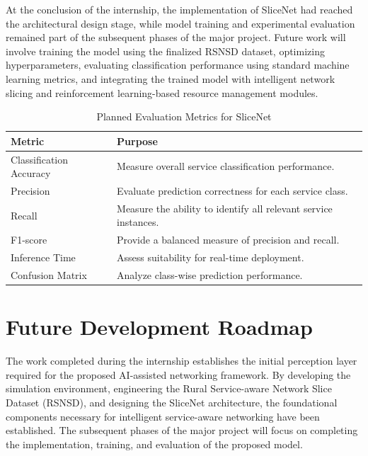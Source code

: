 \documentclass[12pt,a4paper]{report}
\begin{document}
At the conclusion of the internship, the implementation of SliceNet had reached the architectural design stage, while model training and experimental evaluation remained part of the subsequent phases of the major project. Future work will involve training the model using the finalized RSNSD dataset, optimizing hyperparameters, evaluating classification performance using standard machine learning metrics, and integrating the trained model with intelligent network slicing and reinforcement learning-based resource management modules.

\begin{table}[H]
	\centering
	\caption{Planned Evaluation Metrics for SliceNet}
	\label{tab:evaluation_plan}
	
	\begin{tabular}{|p{5cm}|p{7cm}|}
		\hline
		
		\textbf{Metric} &
		\textbf{Purpose}
		\\
		\hline
		
		Classification Accuracy &
		Measure overall service classification performance.
		\\
		\hline
		
		Precision &
		Evaluate prediction correctness for each service class.
		\\
		\hline
		
		Recall &
		Measure the ability to identify all relevant service instances.
		\\
		\hline
		
		F1-score &
		Provide a balanced measure of precision and recall.
		\\
		\hline
		
		Inference Time &
		Assess suitability for real-time deployment.
		\\
		\hline
		
		Confusion Matrix &
		Analyze class-wise prediction performance.
		\\
		\hline
		
	\end{tabular}
	
\end{table}
	\section{Future Development Roadmap}
	\label{sec:future}
	
	The work completed during the internship establishes the initial perception layer required for the proposed AI-assisted networking framework. By developing the simulation environment, engineering the Rural Service-aware Network Slice Dataset (RSNSD), and designing the SliceNet architecture, the foundational components necessary for intelligent service-aware networking have been established. The subsequent phases of the major project will focus on completing the implementation, training, and evaluation of the proposed model.
	
\end{document}
